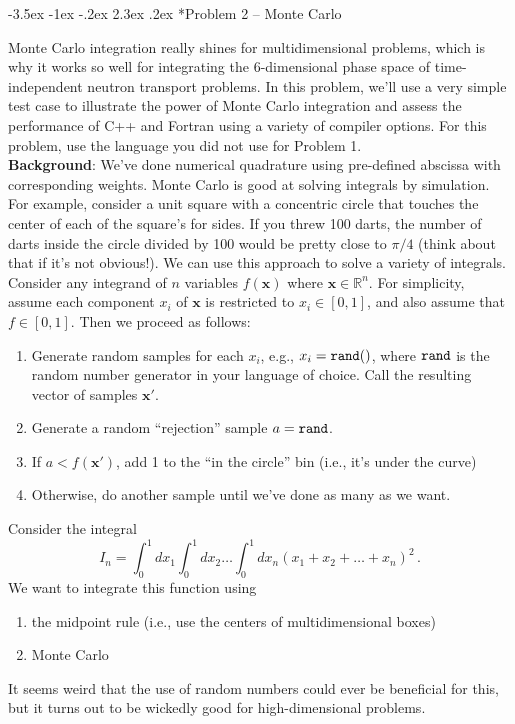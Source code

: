 \documentclass[11pt]{article}
\makeatletter
\renewcommand\section{\@startsection{section}{1}{\z@}%
                                  {-3.5ex \@plus -1ex \@minus -.2ex}%
                                  {2.3ex \@plus.2ex}%
                                  {\normalfont\bfseries}}
\makeatother
\begin{document}
\section*{Problem 2 -- Monte Carlo}

Monte Carlo integration really shines for multidimensional problems, which is
why it works so well for integrating the 6-dimensional phase space of 
time-independent neutron transport problems.  In this problem, we'll use a 
very simple test case to illustrate the power of Monte Carlo integration and 
assess the performance of C++ and Fortran using a variety of 
compiler options.  For this problem, use the language you did not 
use for Problem 1. \\

{\bf Background}:  We've done numerical quadrature using pre-defined 
abscissa with corresponding weights.  Monte Carlo is good at solving integrals
by simulation.  For example, consider a unit square with a concentric circle that 
touches the center of each of the square's for sides.  If you threw 
100 darts, the number of darts inside the circle divided by 100 would 
be pretty close to $\pi/4$ (think about that if it's not obvious!).  
We can use this approach to solve a variety of integrals.  Consider any 
integrand of $n$ variables $f(\mathbf{x})$ where $\mathbf{x} \in \mathbb{R}^n$.
For simplicity, assume each component $x_i$ of $\mathbf{x}$ is 
restricted to $x_i \in [0, 1]$, and also assume that $f \in [0, 1]$.  
Then we proceed as follows:
\begin{enumerate}
 \item Generate random samples for each $x_i$, e.g., $x_i = \tt{rand}()$, where 
       $\tt{rand}$ is the random number generator in your language of choice.
       Call the resulting vector of samples $\mathbf{x}'$.
 \item Generate a random ``rejection'' sample $a = \tt{rand}$.
 \item If $a < f(\mathbf{x}')$, add 1 to the ``in the circle'' bin (i.e., it's 
       under the curve)
 \item Otherwise, do another sample until we've done as many as we want.
\end{enumerate}

Consider the integral
\begin{equation}
 I_n = \int^1_0 dx_1 \int^1_0 dx_2 \ldots \int^1_0 dx_n 
      (x_1 + x_2 + \ldots + x_n)^2 \, .
\end{equation}
We want to integrate this function  using 
\begin{enumerate}
 \item the midpoint rule (i.e., use the centers of multidimensional boxes)
 \item Monte Carlo
\end{enumerate}
It seems weird that the use of random numbers could ever be beneficial for 
this, but it turns out to be wickedly good for high-dimensional problems.
\end{document}
